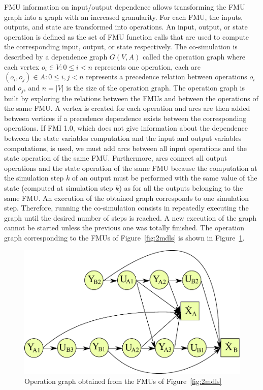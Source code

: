 FMU information on input/output dependence allows transforming the FMU graph into a graph with an increased granularity. For each FMU, the inputs, outputs, and state are transformed into operations. An input, output, or state operation is defined as the set of FMU function calls that are used to compute the corresponding input, output, or state respectively. The co-simulation is described by a dependence graph $G(V,A)$ called the operation graph where each vertex $o_i \in V: 0 \leq i < n$ represents one operation, each arc $(o_i,o_j) \in A: 0 \leq i,j < n$ represents a precedence relation between operations $o_i$ and $o_j$, and $n = |V|$ is the size of the operation graph. The operation graph is built by exploring the relations between the FMUs and between the operations of the same FMU. A vertex is created for each operation and arcs are then added between vertices if a precedence dependence exists between the corresponding operations. If FMI 1.0, which does not give information about the dependence between the state variables computation and the input and output variables computations, is used, we must add arcs between all input operations and the state operation of the same FMU. Furthermore, arcs connect all output operations and the state operation of the same FMU because the computation at the simulation step $k$ of an output must be performed with the same value of the state (computed at simulation step $k$) as for all the outputs belonging to the same FMU. An execution of the obtained graph corresponds to one simulation step. Therefore, running the co-simulation consists in repeatedly executing the graph until the desired number of steps is reached. A new execution of the graph cannot be started unless the previous one was totally finished. The operation graph corresponding to the FMUs of Figure~\ref{fig:2mdls} is shown in Figure~\ref{fig:dag}.

\begin{figure}[htb]
\centering
  \includegraphics[scale=0.5]{figures/Operation_Graph_Two_Models}
\caption{Operation graph obtained from the FMUs of Figure~\ref{fig:2mdls}}
\label{fig:dag}
\end{figure} 

